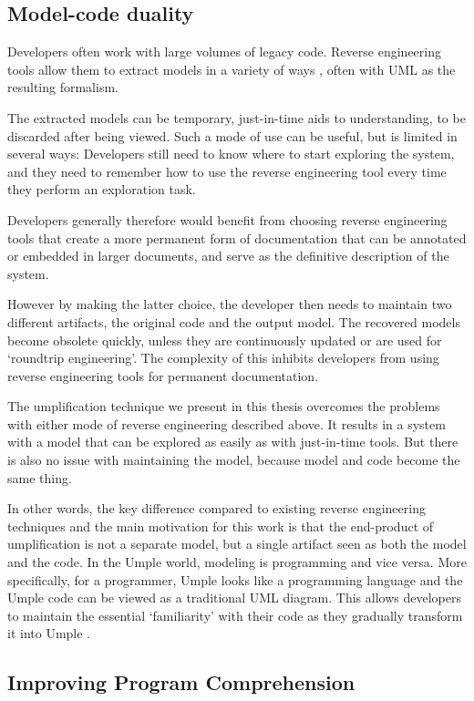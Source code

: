 \subsection{Model-code duality}

Developers often work with large volumes of legacy code. Reverse engineering tools allow them to extract models in a variety of ways \cite{OsmanChaudron}, often with UML as the resulting formalism.

The extracted models can be temporary, just-in-time aids to understanding, to be discarded after being viewed. Such a mode of use can be useful, but is limited in several ways: Developers still need to know where to start exploring the system, and they need to remember how to use the reverse engineering tool every time they perform an exploration task. 

Developers generally therefore would benefit from choosing reverse engineering tools that create a more permanent form of documentation that can be annotated or embedded in larger documents, and serve as the definitive description of the system. 

However by making the latter choice, the developer then needs to maintain two different artifacts, the original code and the output model. The recovered models become obsolete quickly, unless they are continuously updated or are used for `roundtrip engineering'.  The complexity of this inhibits developers from using reverse engineering tools for permanent documentation.

The umplification technique we present in this thesis overcomes the problems with either mode of reverse engineering described above. It results in a system with a model that can be explored as easily as with just-in-time tools. But there is also no issue with maintaining the model, because model and code become the same thing.

In other words, the key difference compared to existing reverse engineering techniques and the main motivation for this work is that the end-product of umplification is not a separate model, but a single artifact seen as both the model and the code. In the Umple world, modeling is programming and vice versa. More specifically, for a programmer, Umple looks like a programming language and the Umple code can be viewed as a traditional UML diagram. This allows developers to maintain the essential `familiarity' with their code as they gradually transform it into Umple \cite{Forward2008}. 

\subsection{Improving Program Comprehension}

